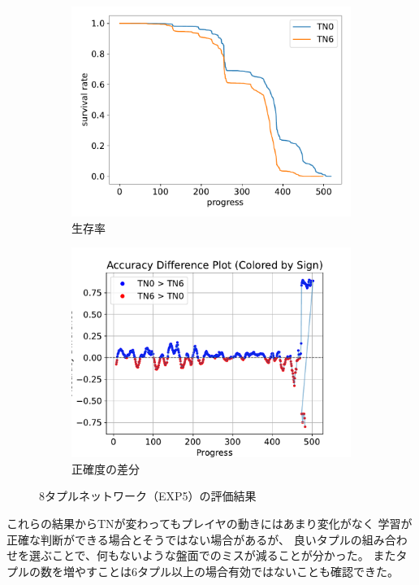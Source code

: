 \begin{figure}[t]
\begin{subfigure}[b]{0.49\linewidth}
    \includegraphics[width=\linewidth]{pdf/compare/merged_EXP_5_NT8_OI1200_compare/survival.pdf}
    \caption{生存率}
    \label{fig:nt8_exp5_survival}
\end{subfigure}
\begin{subfigure}[b]{0.49\linewidth}
    \includegraphics[width=\linewidth]{pdf/compare/merged_EXP_5_NT8_OI1200_compare/acc_diff_plot.pdf}
    \caption{正確度の差分}
    \label{fig:nt8_exp5_acc_diff}
\end{subfigure}
\caption{8タプルネットワーク（EXP5）の評価結果}
\label{fig:nt8_exp5_results}
\end{figure}

これらの結果からTNが変わってもプレイヤの動きにはあまり変化がなく
学習が正確な判断ができる場合とそうではない場合があるが、
良いタプルの組み合わせを選ぶことで、何もないような盤面でのミスが減ることが分かった。
またタプルの数を増やすことは6タプル以上の場合有効ではないことも確認できた。
